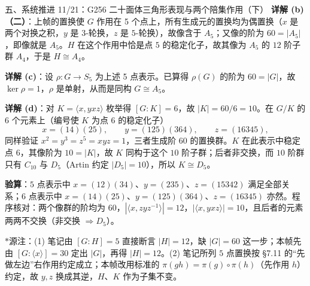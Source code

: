 \documentclass[aspectratio=169,10pt,fontset=none]{ctexbeamer}
\newcommand{\key}[1]{\textcolor{ink}{\bfseries #1}}
\newcommand{\starpt}{\textcolor{accent}{\bfseries$\ast$}}
\begin{document}
\begin{frame}[t]{五、系统推进 11/21：G256 二十面体三角形表现与两个陪集作用（下）}
\scriptsize
\key{详解 (b)（二）}：上帧的置换使 $G$ 作用在 5 个点上，所有生成元的置换均为偶置换（$x$ 是两个对换之积，$y$ 是 $3$-轮换，$z$ 是 $5$-轮换），故像含于 $A_5$；又像的阶为 $60=|A_5|$，即像就是 $A_5$。$H$ 在这个作用中恰是点 $5$ 的稳定化子，故其像为 $A_5$ 的 $12$ 阶子群 $A_4$，于是 $H\cong A_4$。

\key{详解 (c)}：设 $\rho:G\to S_5$ 为上述 5 点表示。已算得 $\rho(G)$ 的阶为 $60=|G|$，故 $\ker\rho=1$，$\rho$ 是单射，从而是同构 $G\cong A_5$。

\key{详解 (d)}：对 $K=\langle x,yxz\rangle$ 枚举得 $[G:K]=6$，故 $|K|=60/6=10$。在 $G/K$ 的 6 个元素上（编号使 $K$ 为点 $6$ 的稳定化子）
\[
x=(14)(25),\qquad y=(125)(364),\qquad z=(16345),
\]
同样验证 $x^2=y^3=z^5=xyz=1$，三者生成阶 $60$ 的置换群。$K$ 在此表示中稳定点 $6$，其像阶为 $10=|K|$，故 $K$ 同构于这个 $10$ 阶子群；后者非交换，而 $10$ 阶群只有 $C_{10}$ 与 $D_5$（Artin 约定 $|D_5|=10$），所以 $K\cong D_5$。

\key{验算}：$5$ 点表示中 $x=(12)(34)$、$y=(235)$、$z=(15342)$ 满足全部关系；$6$ 点表示中 $x=(14)(25)$、$y=(125)(364)$、$z=(16345)$ 亦然。程序核对：两个像群的阶均为 $60$，$|\langle x,zyz^{-1}\rangle|=12$，$|\langle x,yxz\rangle|=10$，且后者的元素两两不交换（非交换 $\Rightarrow D_5$）。

\starpt 源注：(1) 笔记由 $[G:H]=5$ 直接断言 $|H|=12$，缺 $|G|=60$ 这一步；本帧先由 $[G:\langle x\rangle]=30$ 定出 $|G|$，再得 $|H|=12$。(2) 笔记所列 $5$ 点置换按 §7.11 的“先做左边”右作用约定成立；本帧改用标准的 $\pi(gh)=\pi(g)\circ\pi(h)$（先作用 $h$）约定，故 $y,z$ 换成其逆，$H$、$K$ 作为子集不变。
\end{frame}
\end{document}
